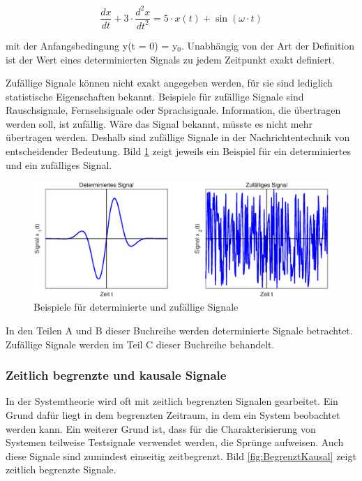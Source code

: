 \begin{equation}\label{eq:onetwo}
\dfrac{dx}{dt} +3\cdot \dfrac{d^{2} x}{dt^{2} } =5\cdot x(t)+\sin (\omega \cdot t)
\end{equation}

\noindent mit der Anfangsbedingung y(t = 0) = y${}_{0}$. Unabh\"{a}ngig von der Art der Definition ist der Wert eines determinierten Signals zu jedem Zeitpunkt exakt definiert.

\noindent Zuf\"{a}llige Signale k\"{o}nnen nicht exakt angegeben werden, f\"{u}r sie sind lediglich statistische Eigenschaften bekannt. Beispiele f\"{u}r zuf\"{a}llige Signale sind Rauschsignale, Fernsehsignale oder Sprachsignale. Information, die \"{u}bertragen werden soll, ist zuf\"{a}llig. W\"{a}re das Signal bekannt, m\"{u}sste es nicht mehr \"{u}bertragen werden. Deshalb sind zuf\"{a}llige Signale in der Nachrichtentechnik von entscheidender Bedeutung. Bild \ref{fig:DeterminierteZuffaeligeSignale} zeigt jeweils ein Beispiel f\"{u}r ein determiniertes und ein zuf\"{a}lliges Signal.


\begin{figure}[H]
  \includegraphics[width=1.0\textwidth]{Kapitel1/Bilder/image2.eps}
  \caption{Beispiele f\"{u}r determinierte und zuf\"{a}llige Signale}
  \label{fig:DeterminierteZuffaeligeSignale}
\end{figure}


\noindent In den Teilen A und B dieser Buchreihe werden determinierte Signale betrachtet. Zuf\"{a}llige Signale werden im Teil C dieser Buchreihe behandelt.


\subsubsection{ Zeitlich begrenzte und kausale Signale}
In der Systemtheorie wird oft mit zeitlich begrenzten Signalen gearbeitet. Ein Grund daf\"{u}r liegt in dem begrenzten Zeitraum, in dem ein System beobachtet werden kann. Ein weiterer Grund ist, dass f\"{u}r die Charakterisierung von Systemen teilweise Testsignale verwendet werden, die Spr\"{u}nge aufweisen. Auch diese Signale sind zumindest einseitig zeitbegrenzt. Bild \ref{fig:BegrenztKausal} zeigt zeitlich begrenzte Signale.


